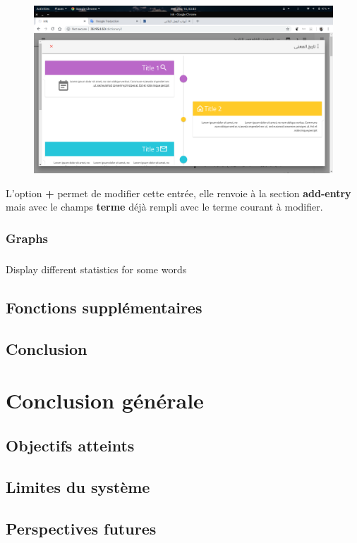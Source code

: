 \documentclass[]{report}
\begin{document}
			\begin{figure}[H]
				\centering
				\includegraphics[width=0.8\linewidth]{images/app/histotimeline.png}
			\end{figure}
			\par
			L'option \textbf{+} permet de modifier cette entrée, elle renvoie à la section \textbf{add-entry} mais avec le champs \textbf{terme} déjà rempli avec le terme courant à modifier.
		\subsection{Graphs}
			\paragraph{}
			Display different statistics for some words
	\section{Fonctions supplémentaires}
	
	\section{Conclusion}


\chapter{Conclusion générale}
\section{Objectifs atteints}
\section{Limites du système}
\section{Perspectives futures}		



\end{document}
